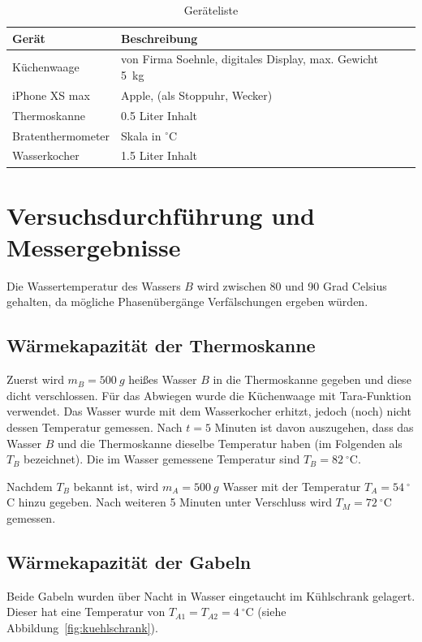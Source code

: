\documentclass{article}
\begin{document}
\begin{table}[H]
\caption{Geräteliste}



\begin{tabular}{lll}
Gerät  & Beschreibung \\
\hline
Küchenwaage & von Firma Soehnle, digitales Display, max. Gewicht 5~kg \\
iPhone XS max & Apple, (als Stoppuhr, Wecker)\\
Thermoskanne & 0.5 Liter Inhalt \\
Bratenthermometer & Skala in ${}^\circ$C \\
Wasserkocher & 1.5 Liter Inhalt
\end{tabular}
\end{table}

\newpage
\section{Versuchsdurchführung und Messergebnisse}

Die Wassertemperatur des Wassers $B$ wird zwischen 80 und 90 Grad Celsius gehalten, da mögliche Phasenübergänge Verfälschungen ergeben würden.

\subsection{Wärmekapazität der Thermoskanne}

Zuerst wird $m_B = 500~g$ heißes Wasser $B$ in die Thermoskanne gegeben und diese dicht verschlossen. Für das Abwiegen wurde die Küchenwaage mit Tara-Funktion verwendet. Das Wasser wurde mit dem Wasserkocher erhitzt, jedoch (noch) nicht dessen Temperatur gemessen. Nach $t=5$ Minuten ist davon auszugehen, dass das Wasser $B$ und die Thermoskanne dieselbe Temperatur haben (im Folgenden als $T_B$ bezeichnet). Die im Wasser gemessene Temperatur sind $T_B= 82~^\circ$C.

Nachdem $T_B$ bekannt ist, wird $m_A = 500~g$ Wasser mit der Temperatur $T_A = 54~^\circ$C hinzu gegeben. Nach weiteren 5 Minuten unter Verschluss wird $T_M = 72~^\circ$C gemessen.

\subsection{Wärmekapazität der Gabeln}

Beide Gabeln wurden über Nacht in Wasser eingetaucht im Kühlschrank gelagert. Dieser hat eine Temperatur von $T_{A1} = T_{A2} = 4~^\circ$C (siehe Abbildung~\ref{fig:kuehlschrank}).
\end{document}
